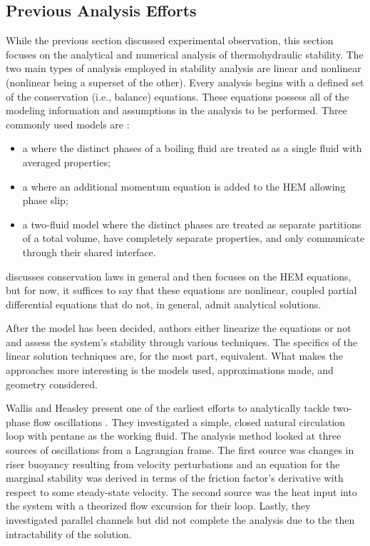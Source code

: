 \subsection{Previous Analysis Efforts}

While the previous section discussed experimental observation, this section focuses on the analytical and numerical analysis of thermohydraulic stability.
The two main types of analysis employed in stability analysis are linear and nonlinear (nonlinear being a superset of the other).
Every analysis begins with a defined set of the conservation (i.e., balance) equations.
These equations possess all of the modeling information and assumptions in the analysis to be performed.
Three commonly used models are \cite{johnson_handbook_1998}:
\begin{itemize}
    \item{a  where the distinct phases of a boiling fluid are treated as a single fluid with averaged properties;}
    \item{a  where an additional momentum equation is added to the HEM allowing phase slip;}
    \item{a two-fluid model where the distinct phases are treated as separate partitions of a total volume, have completely separate properties, and only communicate through their shared interface.}
\end{itemize}
 discusses conservation laws in general and then focuses on the HEM equations, but for now, it suffices to say that these equations are nonlinear, coupled partial differential equations that do not, in general, admit analytical solutions.

After the model has been decided, authors either linearize the equations or not and assess the system's stability through various techniques.
The specifics of the linear solution techniques are, for the most part, equivalent.
What makes the approaches more interesting is the models used, approximations made, and geometry considered.

Wallis and Heasley present one of the earliest efforts to analytically tackle two-phase flow oscillations \cite{wallis_oscillations_1961}.
They investigated a simple, closed natural circulation loop with pentane as the working fluid.
The analysis method looked at three sources of oscillations from a Lagrangian frame.
The first source was changes in riser buoyancy resulting from velocity perturbations and an equation for the marginal stability was derived in terms of the friction factor's derivative with respect to some steady-state velocity.
The second source was the heat input into the system with a theorized flow excursion for their loop.
Lastly, they investigated parallel channels but did not complete the analysis due to the then intractability of the solution.

